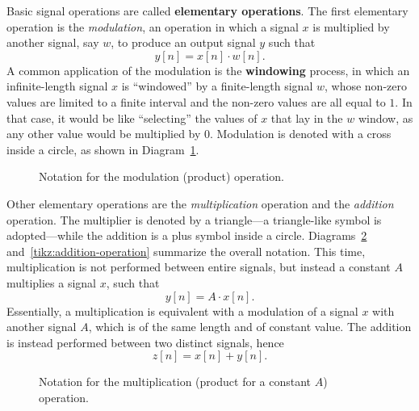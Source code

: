 \documentclass[\documentfontsize, twocolumn]{\classname}
\begin{document}
Basic signal operations are called \textbf{elementary operations}. The first elementary operation is the \emph{modulation}, an operation in which a signal $x$ is multiplied by another signal, say $w$, to produce an output signal $y$ such that $$y[n] = x[n]\cdot w[n].$$ A common application of the modulation is the \textbf{windowing} process, in which an infinite-length signal $x$ is ``windowed'' by a finite-length signal $w$, whose non-zero values are limited to a finite interval and the non-zero values are all equal to $1$. In that case, it would be like ``selecting'' the values of $x$ that lay in the $w$ window, as any other value would be multiplied by $0$. Modulation is denoted with a cross inside a circle, as shown in Diagram~\ref{tikz:modulation-operation}.

\begin{figure}[ht]
\begin{center}
    \caption{Notation for the modulation (product) operation.}\label{tikz:modulation-operation}
\end{center}
\end{figure}

Other elementary operations are the \emph{multiplication} operation and the \emph{addition} operation. The multiplier is denoted by a triangle---a triangle-like symbol is adopted---while the addition is a plus symbol inside a circle. Diagrams~\ref{tikz:multiplication-operation} and~\ref{tikz:addition-operation} summarize the overall notation. This time, multiplication is not performed between entire signals, but instead a constant $A$ multiplies a signal $x$, such that $$y[n] = A \cdot x[n].$$ Essentially, a multiplication is equivalent with a modulation of a signal $x$ with another signal $A$, which is of the same length and of constant value. The addition is instead performed between two distinct signals, hence $$z[n] = x[n] + y[n].$$ 

\begin{figure}[ht]
\begin{center}
    \caption{Notation for the multiplication (product for a constant $A$) operation.}\label{tikz:multiplication-operation}
\end{center}
\end{figure}
\end{document}
